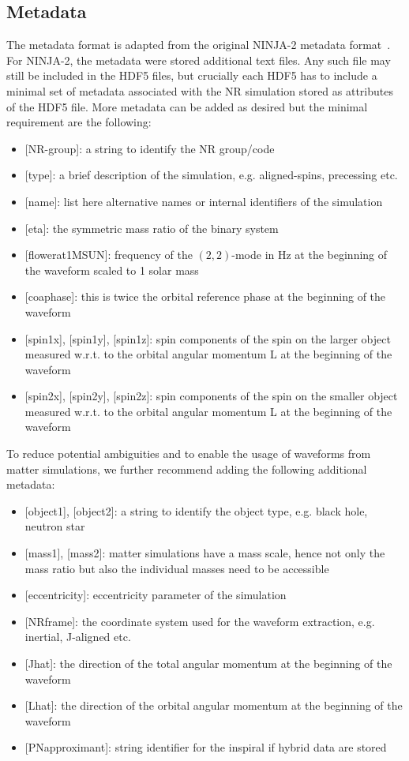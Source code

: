 \documentclass[aps,prd,amssymb,amsmath,amsfonts,superscriptaddress,
floatfix ,preprintnumbers,altaffilletter]{revtex4}
\begin{document}
\subsection{Metadata}
\label{sec:meta}
The metadata format is adapted from the original NINJA-2 metadata format~\cite{Brown:2007jx}. For NINJA-2, the metadata were stored
additional text files. Any such file may still be included in the HDF5 files, but crucially 
each HDF5 has to include a minimal set of metadata associated with the NR simulation stored as attributes of the HDF5 file. 
More metadata can be added as desired but the minimal requirement are the following: \\
\begin{itemize}
\item {[}NR-group{]}: a string to identify the NR group/code
\item {[}type{]}: a brief description of the simulation, e.g. aligned-spins, precessing etc.
\item{[}name{]}: list here alternative names or internal identifiers of the simulation
\item{[}eta{]}: the symmetric mass ratio of the binary system
\item{[}f\textunderscore lower\textunderscore at\textunderscore 1MSUN{]}: frequency of the $(2,2)$-mode in Hz at the beginning of the waveform scaled to 1 solar mass
\item{[}coa\textunderscore phase{]}: this is twice the orbital reference phase at the beginning of the waveform
\item{[}spin1x{]}, {[}spin1y{]}, {[}spin1z{]}: spin components of the spin on the larger object measured w.r.t. to the orbital angular momentum L at the beginning of the waveform
\item{[}spin2x{]}, {[}spin2y{]}, {[}spin2z{]}: spin components of the spin on the smaller object measured w.r.t. to the orbital angular momentum L at the beginning of the waveform
\end{itemize}
To reduce potential ambiguities and to enable the usage of waveforms from matter simulations, we further recommend adding the following  additional metadata:
\begin{itemize}
\item{[}object1{]}, {[}object2{]}: a string to identify the object type, e.g. black hole, neutron star
\item{[}mass1{]}, {[}mass2{]}: matter simulations have a mass scale, hence not only the mass ratio but also the individual masses need to be accessible
\item{[}eccentricity{]}: eccentricity parameter of the simulation
\item{[}NR\textunderscore frame{]}: the coordinate system used for the waveform extraction, e.g. inertial, J-aligned etc.
\item{[}J\textunderscore hat{]}: the direction of the total angular momentum at the beginning of the waveform
\item{[}L\textunderscore hat{]}: the direction of the orbital angular momentum at the beginning of the waveform
\item{[}PN\textunderscore approximant{]}: string identifier for the inspiral if hybrid data are stored
\end{itemize}
\end{document}
